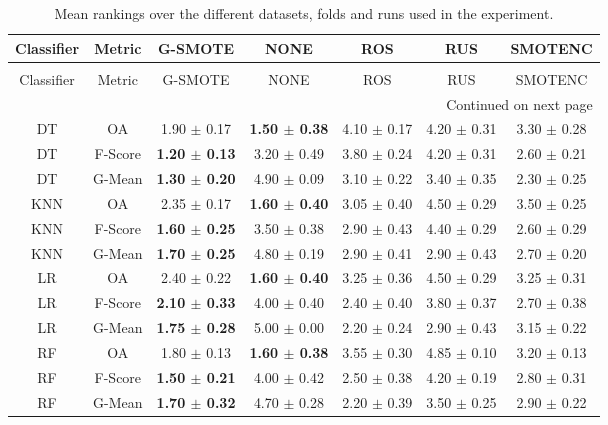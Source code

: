 \begin{longtable}{ccccccc}
\caption{Mean rankings over the different datasets, folds and runs used in the experiment.}
\label{tbl:mean_sem_ranks}\\
\toprule
Classifier &  Metric &                  G-SMOTE &                     NONE &             ROS &             RUS &         SMOTENC \\
\midrule
\endfirsthead
\caption[]{Mean rankings over the different datasets, folds and runs used in the experiment.} \\
\toprule
Classifier &  Metric &                  G-SMOTE &                     NONE &             ROS &             RUS &         SMOTENC \\
\midrule
\endhead
\midrule
\multicolumn{7}{r}{{Continued on next page}} \\
\midrule
\endfoot

\bottomrule
\endlastfoot
        DT &      OA &          1.90 $\pm$ 0.17 & \textbf{1.50 $\pm$ 0.38} & 4.10 $\pm$ 0.17 & 4.20 $\pm$ 0.31 & 3.30 $\pm$ 0.28 \\
        DT & F-Score & \textbf{1.20 $\pm$ 0.13} &          3.20 $\pm$ 0.49 & 3.80 $\pm$ 0.24 & 4.20 $\pm$ 0.31 & 2.60 $\pm$ 0.21 \\
        DT &  G-Mean & \textbf{1.30 $\pm$ 0.20} &          4.90 $\pm$ 0.09 & 3.10 $\pm$ 0.22 & 3.40 $\pm$ 0.35 & 2.30 $\pm$ 0.25 \\
       KNN &      OA &          2.35 $\pm$ 0.17 & \textbf{1.60 $\pm$ 0.40} & 3.05 $\pm$ 0.40 & 4.50 $\pm$ 0.29 & 3.50 $\pm$ 0.25 \\
       KNN & F-Score & \textbf{1.60 $\pm$ 0.25} &          3.50 $\pm$ 0.38 & 2.90 $\pm$ 0.43 & 4.40 $\pm$ 0.29 & 2.60 $\pm$ 0.29 \\
       KNN &  G-Mean & \textbf{1.70 $\pm$ 0.25} &          4.80 $\pm$ 0.19 & 2.90 $\pm$ 0.41 & 2.90 $\pm$ 0.43 & 2.70 $\pm$ 0.20 \\
        LR &      OA &          2.40 $\pm$ 0.22 & \textbf{1.60 $\pm$ 0.40} & 3.25 $\pm$ 0.36 & 4.50 $\pm$ 0.29 & 3.25 $\pm$ 0.31 \\
        LR & F-Score & \textbf{2.10 $\pm$ 0.33} &          4.00 $\pm$ 0.40 & 2.40 $\pm$ 0.40 & 3.80 $\pm$ 0.37 & 2.70 $\pm$ 0.38 \\
        LR &  G-Mean & \textbf{1.75 $\pm$ 0.28} &          5.00 $\pm$ 0.00 & 2.20 $\pm$ 0.24 & 2.90 $\pm$ 0.43 & 3.15 $\pm$ 0.22 \\
        RF &      OA &          1.80 $\pm$ 0.13 & \textbf{1.60 $\pm$ 0.38} & 3.55 $\pm$ 0.30 & 4.85 $\pm$ 0.10 & 3.20 $\pm$ 0.13 \\
        RF & F-Score & \textbf{1.50 $\pm$ 0.21} &          4.00 $\pm$ 0.42 & 2.50 $\pm$ 0.38 & 4.20 $\pm$ 0.19 & 2.80 $\pm$ 0.31 \\
        RF &  G-Mean & \textbf{1.70 $\pm$ 0.32} &          4.70 $\pm$ 0.28 & 2.20 $\pm$ 0.39 & 3.50 $\pm$ 0.25 & 2.90 $\pm$ 0.22 \\
\end{longtable}
